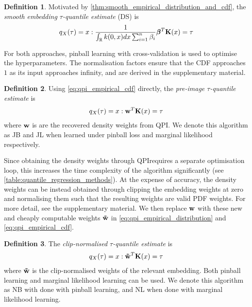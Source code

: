 \documentclass[twoside]{article} \usepackage{aistats2017}
\theoremstyle{definition}
\newtheorem{definition}{Definition}[section]
\theoremstyle{theorem}
\newcommand{\rv}[1]{{#1}}
\newcommand{\qpi}{QPI}
\begin{document}
	\theoremstyle{definition}
	\begin{definition}
		Motivated by \cref{thm:smooth_empirical_distribution_and_cdf}, the \textit{smooth embedding $\tau$-quantile estimate} (DS) is
		\begin{equation}
		q_{\rv{X}}(\tau) = x : \frac{1}{\int_{\mathbb{R}} k(0, x) dx \sum_{i = 1}^{n} \beta_{i}} \bm{\beta}^{T} \bvec{K}(x) = \tau
		\end{equation}	
	\end{definition}
	
	For both approaches, pinball learning with cross-validation is used to optimise the hyperparameters. The normalisation factors ensure that the CDF approaches $1$ as its input approaches infinity, and are derived in the supplementary material.

	\theoremstyle{definition}
	\begin{definition}
		Using \eqref{eq:qpi_empirical_cdf} directly, the \textit{pre-image $\tau$-quantile estimate} is
		\begin{equation}
			q_{\rv{X}}(\tau) = x : \bvec{w}^{T} \bvec{K}(x) = \tau
		\end{equation}	
		where $\mathbf{w}$ is are the recovered density weights from QPI.
		We denote this algorithm as JB and JL when learned under pinball loss and marginal likelihood respectively.
	\end{definition}
	
	Since obtaining the density weights through \qpi\space requires a separate optimisation loop, this increases the time complexity of the algorithm significantly (see \cref{table:quantile_regression_methods}). At the expense of accuracy, the density weights can be instead obtained through clipping the embedding weights at zero and normalising them such that the resulting weights are valid PDF weights. For more detail, see the supplementary material. We then replace $\mathbf{w}$ with these new and cheaply computable weights $\mathbf{\tilde{w}}$ in \eqref{eq:qpi_empirical_distribution} and \eqref{eq:qpi_empirical_cdf}.
%
%

	\theoremstyle{definition}
	\begin{definition}
		The \textit{clip-normalised $\tau$-quantile estimate} is
		\begin{equation}
			q_{\rv{X}}(\tau) = x : \bvec{\tilde{w}}^{T} \bvec{K}(x) = \tau
		\end{equation}
		where $\mathbf{\tilde{w}}$ is the clip-normalised weights of the relevant embedding.
		Both pinball learning and marginal likelihood learning can be used. We denote this algorithm as NB with done with pinball learning, and NL when done with marginal likelihood learning.
	\end{definition}	
	
\end{document}
